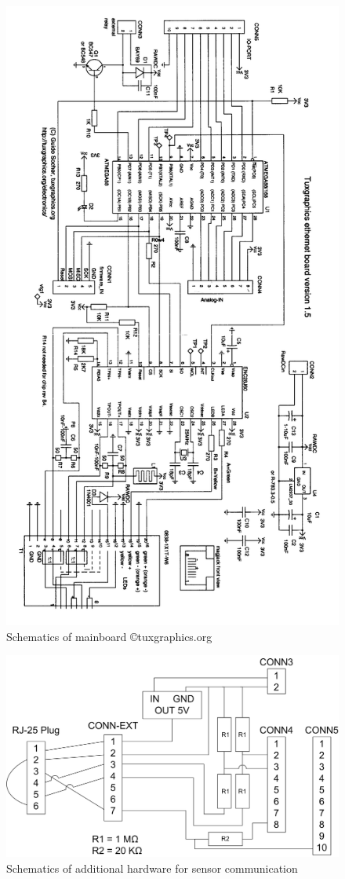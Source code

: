 \begin{figure}[H]
    \centering
    \includegraphics[width=0.7\linewidth]{graphics/schematics1.png}
    \caption{Schematics of mainboard \copyright tuxgraphics.org}
    \label{fig:mainboard_schematic1}
\end{figure}

\begin{figure}[H]
    \centering
    \includegraphics[width=\linewidth]{graphics/schematics.png}
    \caption{Schematics of additional hardware for sensor communication}
    \label{fig:mainboard_schematic}
\end{figure}

